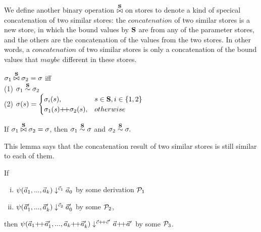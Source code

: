We define another binary operation $\x\S$ on stores to denote a kind of specical concatenation of two similar stores: 
the $concatenation$ of two similar stores is a new store, in which the bound values by $\S$ are from any of the parameter stores, and 
the others are the concatenation of the values from the two stores. 
In other words, a $concatenation$ of two similar stores is only a concatenation of the bound values that $maybe$ different in these stores.
\begin{defi}
	\label{def-sgm-join}
	$\sgm_1 \x{\S} \sgm_2 = \sgm$ iff \\
	(1) $\sgm_1 \~{\S} \sgm_2$  \\
	(2) $\sgm(s) =
	\begin{cases}
	\sgm_i(s),& s \in \S, i \in \{1,2\}\\
	\sgm_1(\s) {\++} \sgm_2(s), & otherwise \\
	\end{cases} $
\end{defi}

\begin{lem} \label{lem-join1}
	If $\sgm_1 \x{\S} \sgm_2 = \sgm$, 
	then $\sgm_1 \~{\S} \sgm$ and $\sgm_2 \~{\S} \sgm.$
\end{lem}
This lemma says that the concatenation result of two similar stores is still similar to each of them.


\begin{lem} \label{lem-psi-join}
	If \begin{enumerate}[(i)]
	 \item $\sevalfg{\lcall}{\a_{1},...,\a_{k}}{\c_1}{\a_0}$ by some derivation $\MP_1$
	 \item $\sevalfg{\lcall}{\a'_{1},...,\a'_{k}}{\c_2}{\a_0'}$ by some $\MP_2$,
	\end{enumerate}
	then $\sevalfg{\lcall}{\a_{1} {\++} \a'_{1},...,\a_{k} {\++} \a'_{k}}{\c {\++} \c'}{\a {\++} \a'}$ by some $\MP_3$.
\end{lem}

